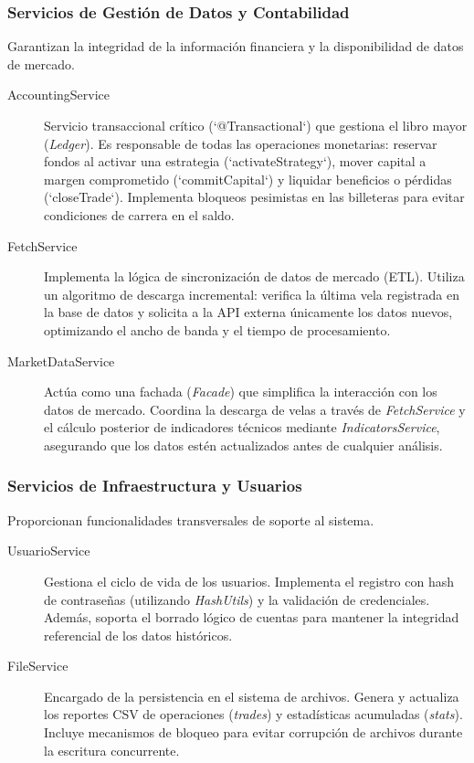 \documentclass[12pt, letterpaper]{article}
\begin{document}
\subsubsection{Servicios de Gestión de Datos y Contabilidad}
Garantizan la integridad de la información financiera y la disponibilidad de datos de mercado.

\begin{description}
    \item[AccountingService] Servicio transaccional crítico (`@Transactional`) que gestiona el libro mayor (\textit{Ledger}). Es responsable de todas las operaciones monetarias: reservar fondos al activar una estrategia (`activateStrategy`), mover capital a margen comprometido (`commitCapital`) y liquidar beneficios o pérdidas (`closeTrade`). Implementa bloqueos pesimistas en las billeteras para evitar condiciones de carrera en el saldo.

    \item[FetchService] Implementa la lógica de sincronización de datos de mercado (ETL). Utiliza un algoritmo de descarga incremental: verifica la última vela registrada en la base de datos y solicita a la API externa únicamente los datos nuevos, optimizando el ancho de banda y el tiempo de procesamiento.

    \item[MarketDataService] Actúa como una fachada (\textit{Facade}) que simplifica la interacción con los datos de mercado. Coordina la descarga de velas a través de \textit{FetchService} y el cálculo posterior de indicadores técnicos mediante \textit{IndicatorsService}, asegurando que los datos estén actualizados antes de cualquier análisis.
\end{description}

\subsubsection{Servicios de Infraestructura y Usuarios}
Proporcionan funcionalidades transversales de soporte al sistema.

\begin{description}
    \item[UsuarioService] Gestiona el ciclo de vida de los usuarios. Implementa el registro con hash de contraseñas (utilizando \textit{HashUtils}) y la validación de credenciales. Además, soporta el borrado lógico de cuentas para mantener la integridad referencial de los datos históricos.

    \item[FileService] Encargado de la persistencia en el sistema de archivos. Genera y actualiza los reportes CSV de operaciones (\textit{trades}) y estadísticas acumuladas (\textit{stats}). Incluye mecanismos de bloqueo para evitar corrupción de archivos durante la escritura concurrente.
\end{description}
\end{document}
